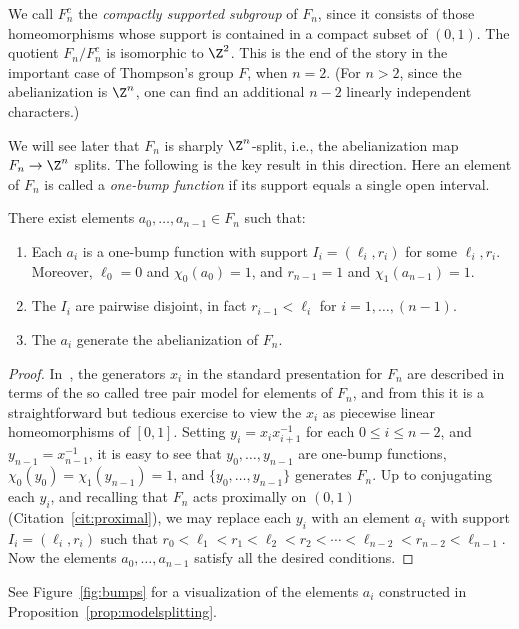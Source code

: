 We call $F_n^c$ the \emph{compactly supported subgroup} of $F_n$, since it consists of those homeomorphisms whose support is contained in a compact subset of $(0, 1)$. The quotient $F_n / F_n^c$ is isomorphic to $\Z^2$. This is the end of the story in the important case of Thompson's group $F$, when $n  = 2$. (For $n > 2$, since the abelianization is $\Z^n$, one can find an additional $n-2$ linearly independent characters.)

We will see later that $F_n$ is sharply $\Z^n$-split, i.e., the abelianization map $F_n\to\Z^n$ splits. The following is the key result in this direction. Here an element of $F_n$ is called a \emph{one-bump function} if its support equals a single open interval.

\begin{prop}\label{prop:modelsplitting}
There exist elements $a_0, \ldots, a_{n-1} \in F_n$ such that:
\begin{enumerate}
\item Each $a_i$ is a one-bump function with support $I_i = (\ell_i, r_i)$ for some $\ell_i,r_i$. Moreover, $\ell_0 = 0$ and $\chi_0(a_0)=1$, and $r_{n-1} = 1$ and $\chi_1(a_{n-1})=1$.
\item The $I_i$ are pairwise disjoint, in fact $r_{i-1} < \ell_i$ for $i = 1, \ldots, (n-1)$.
\item The $a_i$ generate the abelianization of $F_n$.
\end{enumerate}
\end{prop}

\begin{proof}
In~\cite{burillo01}, the generators $x_i$ in the standard presentation for $F_n$ are described in terms of the so called tree pair model for elements of $F_n$, and from this it is a straightforward but tedious exercise to view the $x_i$ as piecewise linear homeomorphisms of $[0,1]$. Setting $y_i=x_ix_{i+1}^{-1}$ for each $0\le i\le n-2$, and $y_{n-1}=x_{n-1}^{-1}$, it is easy to see that $y_0,\dots,y_{n-1}$ are one-bump functions, $\chi_0(y_0)=\chi_1(y_{n-1})=1$, and $\{y_0,\dots,y_{n-1}\}$ generates $F_n$. Up to conjugating each $y_i$, and recalling that $F_n$ acts proximally on $(0,1)$ (Citation~\ref{cit:proximal}), we may replace each $y_i$ with an element $a_i$ with support $I_i = (\ell_i, r_i)$ such that $r_0 < \ell_1 < r_1 < \ell_2 < r_2 < \cdots < \ell_{n-2} < r_{n-2} < \ell_{n-1}$. Now the elements $a_0,\dots,a_{n-1}$ satisfy all the desired conditions.
\end{proof}

See Figure~\ref{fig:bumps} for a visualization of the elements $a_i$ constructed in Proposition~\ref{prop:modelsplitting}.

